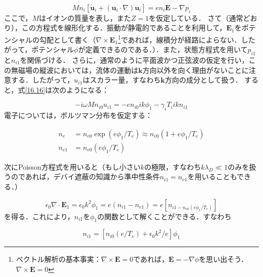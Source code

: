 \documentclass{ltjsarticle}
\numberwithin{equation}{section} %
\begin{document}
\begin{equation}
  Mn_i[\dot{\bm{u}}_i + (\bm{u}_i \cdot \nabla)\bm{u}_i] = en_i\bm{E} - \nabla p_i \label{16.16} 
\end{equation}
ここで，$M$はイオンの質量を表し，また$Z=1$を仮定している．
さて（通常どおり），この方程式を線形化する．振動が静電的であることを利用して，$\bm{E}_1$をポテンシャルの勾配として書く（$\nabla \times \bm{E}_1$\footnote{ベクトル解析の基本事実：$\nabla \times \bm{E} =0$であれば，$\bm{E}=-\nabla \phi$を思い出そう．$\nabla \times \bm{E}=0$}であれば，線積分が経路によらない．したがって，ポテンシャル$\phi$が定義できるのである．）．また，状態方程式を用いて$p_{i1}$と$n_{i1}$を関係づける．
さらに，通常のように平面波かつ正弦波の仮定を行い，この無磁場の縦波においては，流体の運動は$\bm{k}$方向以外を向く理由がないことに注意する．したがって，$u_{i1}$はスカラー量，すなわち$\bm{k}$方向の成分として扱う．
すると，式\eqref{16.16}は次のようになる：

\begin{equation}
  -i\omega Mn_{i0}u_{i1} = -en_{i0}ik\phi_1 - \gamma_iT_iikn_{i1} \label{16.17}
\end{equation}
電子については，ボルツマン分布を仮定する：

\begin{equation}
  \begin{aligned}
    n_e &= n_{e0}\exp (e\phi_1/T_e) \approx n_{e0}(1+e\phi_1/T_e)\\
    n_{e1} &= n_{e0}(e\phi_1/T_e) 
  \end{aligned} \label{16.18}
\end{equation}

次にPoisson方程式を用いると（もし小さい$k$の極限，すなわち$k\lambda_D\ll 1$のみを扱うのであれば，デバイ遮蔽の知識から準中性条件$n_{i1}=n_{e1}$を用いることもできる．）

\begin{equation}
  \epsilon_0\nabla \cdot \bm{E}_1 = \epsilon_0k^2\phi_1 = e(n_{i1} - n_{e1}) = e[n_{i1 - n_{e0}(e\phi_1/T_e)}] \label{16.19}
\end{equation}
を得る．これにより，$n_{i1}$を$\phi_1$の関数として解くことができる．すなわち

\begin{equation}
  n_{i1} = [n_{i0}(e/T_e)+\epsilon_0k^2/e]\phi_1 \label{16.20}
\end{equation}
\end{document}
